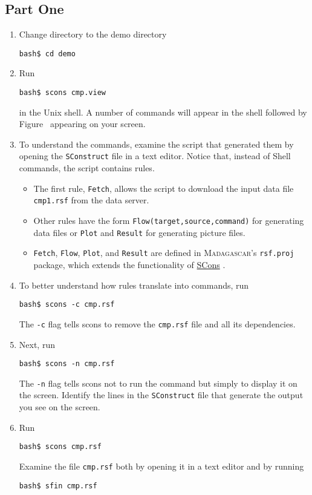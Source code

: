 \subsection{Part One}
\begin{enumerate}
\item Change directory to the demo directory
\begin{verbatim}
bash$ cd demo
\end{verbatim}
\item Run
\begin{verbatim}
bash$ scons cmp.view
\end{verbatim}
in the Unix shell. A number of commands will appear in the shell followed by Figure~ appearing on your screen. 
\item To understand the commands, examine the script that generated them by opening the \texttt{SConstruct} file in a text editor. Notice that, instead of Shell commands, the script contains rules. 
\begin{itemize}
\item The first rule, \texttt{Fetch}, allows the script to download the input data file \texttt{cmp1.rsf} from the data server. 
\item Other rules have the form \texttt{Flow(target,source,command)} for generating data files or \texttt{Plot} and  \texttt{Result} for 
generating picture files. 
\item \texttt{Fetch}, \texttt{Flow}, \texttt{Plot}, and \texttt{Result} are defined in \textsc{Madagascar}'s \texttt{rsf.proj} package, which extends the functionality of \href{http://www.scons.org}{SCons}
.
\end{itemize}
\item To better understand how rules translate into commands, run 
\begin{verbatim}
bash$ scons -c cmp.rsf
\end{verbatim}
The \texttt{-c} flag tells scons to remove the \texttt{cmp.rsf} file and all its dependencies.
\item Next, run
\begin{verbatim}
bash$ scons -n cmp.rsf
\end{verbatim}
The \texttt{-n} flag tells scons not to run the command but simply to display it on the screen. Identify the lines in the \texttt{SConstruct} file that generate the output you see on the screen.
\item Run
\begin{verbatim}
bash$ scons cmp.rsf
\end{verbatim}
Examine the file \texttt{cmp.rsf} both by opening it in a text editor and by running
\begin{verbatim}
bash$ sfin cmp.rsf
\end{verbatim}
\end{enumerate}

